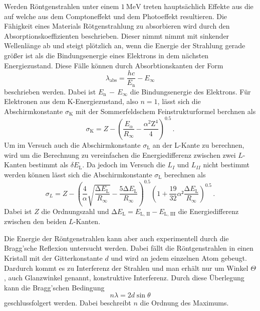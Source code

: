 \noindent
Werden Röntgenstrahlen unter einem $\SI{1}{\mega\electronvolt}$ treten hauptsächlich Effekte aus die auf welche aus dem Comptoneffekt und dem Photoeffekt resultieren. Die Fähigkeit eines 
Materials Rötgenstrahlung zu absorbieren wird durch den Absorptionskoeffizienten beschrieben. Dieser nimmt nimmt mit sinkender Wellenlänge ab und steigt plötzlich an, wenn die 
Energie der Strahlung gerade größer ist als die Bindungsenergie eines Elektrons in dem nächsten Energiezustand. Diese Fälle können durch Absorbtionskanten der Form
\begin{equation}
    \lambda_\text{abs} = \frac{h c}{E_\text{n}} - E_\infty
\end{equation}
beschrieben werden. Dabei ist $E_\text{n} \, - \, E_\infty$ die Bindungsenergie des Elektrons. Für Elektronen aus dem K-Energiezustand, also $n=1$, lässt sich die Abschirmkonstante 
$\sigma_\text{K}$ mit der Sommerfeldschem Feinstrukturformel berchnen als
\begin{equation}
    \sigma_\text{K} = Z - \left(\frac{E_\alpha}{R_\infty} - \frac{\alpha^2 \text{Z}^4}{4}\right)^{0.5} \, .
    \label{eqn:sigmaK}
\end{equation}
\noindent
Um im Versuch auch die Abschirmkonstante $\sigma_\text{L}$ an der L-Kante zu berechnen, wird um die Berechnung zu vereinfachen die Energiedifferenz zwischen zwei $L$-Kanten bestimmt als
$\delta E_\text{L}$. Da jedoch im Versuch die $L_I$ und $L_{II}$ nicht bestimmt werden können lässt sich die Abschirmkonstante $\sigma_\text{L}$ berechnen als 
\begin{equation}
    \sigma_L = Z - \left(\frac{4}{\alpha} \sqrt{ \frac{\increment E_\text{L}}{R_\infty}} - \frac{5 \increment E_\text{L}}{R_\infty}\right)^{0.5} \left(1 + \frac{19}{32} \alpha² \frac{\increment E_\text{L}}{R_\infty}\right)^{0.5} \, .
\label{eqn:Ligma}
\end{equation}
\noindent
Dabei ist $Z$ die Ordnungszahl und $\increment E_\text{L} = E_{\text{L, II}} - E_{\text{L, III}}$ die Energiedifferenz zwischen den beiden $L$-Kanten.

\noindent
Die Energie der Röntgenstrahlen kann aber auch experimentell durch die Bragg'sche Reflexion untersucht werden. Dabei fällt die Röntgenstrahlen in einen Kristall mit der Gitterkonstante $d$ und wird an jedem einzelnen
Atom gebeugt. Dardurch kommt es zu Interferenz der Strahlen und man erhält nur um Winkel $\Theta$, auch Glanzwinkel genannt, konstruktive Interferenz. Durch diese Überlegung kann die Bragg'schen Bedingung 
\begin{equation}
  n \lambda = 2 d \sin{\theta}
\label{eqn:bragg}
\end{equation}
\noindent
geschlussfolgert werden. Dabei beschreibt $n$ die Ordnung des Maximums.



